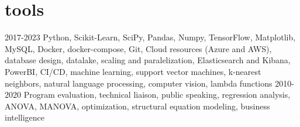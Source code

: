 \documentclass[]{twentysecondcv}
\begin{document}
\section{tools}
	\begin{twentyshort}
	\twentyitemshort
	{2017-2023}
	{Python, Scikit-Learn, SciPy, Pandas, Numpy, TensorFlow, Matplotlib, MySQL, Docker, docker-compose, Git, Cloud resources (Azure and AWS), database design, datalake, scaling and paralelization, Elasticsearch and Kibana, PowerBI, CI/CD, machine learning, support vector machines, k-nearest neighbors, natural language processing, computer vision, lambda functions}
	\twentyitemshort
	{2010-2020}
	{Program evaluation, technical liaison, public speaking, regression analysis, ANOVA, MANOVA, optimization, structural equation modeling, business intelligence}
	\end{twentyshort}

\end{document}
